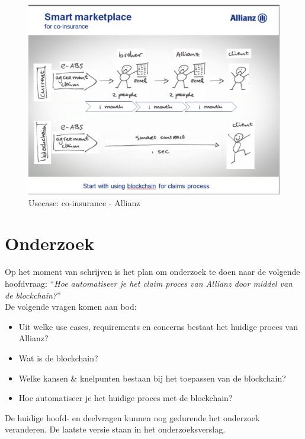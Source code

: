 \begin{figure}[h!]
    \begin{center}
        \includegraphics[scale=0.5]{images/allianz-blockchain}
        \caption{Usecase: co-insurance - Allianz}
        \label{fig:allianz-blockchain}
    \end{center}
\end{figure}

\newpage
\section{Onderzoek}
Op het moment van schrijven is het plan om onderzoek te doen naar de volgende hoofdvraag: ``\textit{Hoe automatiseer je het claim proces van Allianz door middel van de blockchain?}''\\
De volgende vragen komen aan bod:
\begin{itemize}
  \item Uit welke use cases, requirements en concerns bestaat het huidige proces van Allianz?
  \item Wat is de blockchain?
  \item Welke kansen \& knelpunten bestaan bij het toepassen van de blockchain?
  \item Hoe automatiseer je het huidige proces met de blockchain?
\end{itemize}
De huidige hoofd- en deelvragen kunnen nog gedurende het onderzoek veranderen. De laatste versie staan in het onderzoeksverslag.